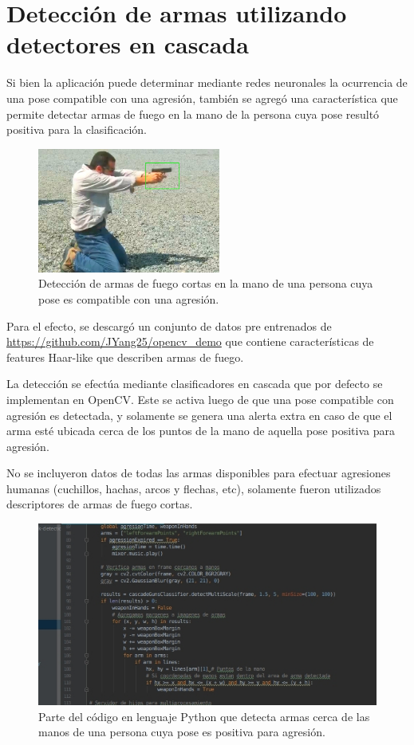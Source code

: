 \documentclass[a4paper,12pt,oneside,spanish]{book}
\begin{document}
\section{Detección de armas utilizando detectores en cascada}\label{deteccionarmas}
Si bien la aplicación puede determinar mediante redes neuronales la ocurrencia de una pose compatible con una agresión, también se agregó una característica que permite detectar armas de fuego en la mano de la persona cuya pose resultó positiva para la clasificación.\par

\begin{figure}[h!]
	\includegraphics[width=170pt]{Imagenes/output2.jpg}
	\centering	
	\caption{Detección de armas de fuego cortas en la mano de una persona cuya pose es compatible con una agresión.}
	\label{fig:output2}
\end{figure}

Para el efecto, se descargó un conjunto de datos pre entrenados de \url{https://github.com/JYang25/opencv_demo} que contiene características de features Haar-like que describen armas de fuego.\par

La detección se efectúa mediante clasificadores en cascada que por defecto se implementan en OpenCV. Este se activa luego de que una pose compatible con agresión es detectada, y solamente se genera una alerta extra en caso de que el arma esté ubicada cerca de los puntos de la mano de aquella pose positiva para agresión.\par

No se incluyeron datos de todas las armas disponibles para efectuar agresiones humanas (cuchillos, hachas, arcos y flechas, etc), solamente fueron utilizados descriptores de armas de fuego cortas.\par

\begin{figure}[h!]
	\includegraphics[width=350pt]{Imagenes/code1.jpg}
	\centering	
	\caption{Parte del código en lenguaje Python que detecta armas cerca de las manos de una persona cuya pose es positiva para agresión.}
	\label{fig:code1}
\end{figure}
\end{document}
